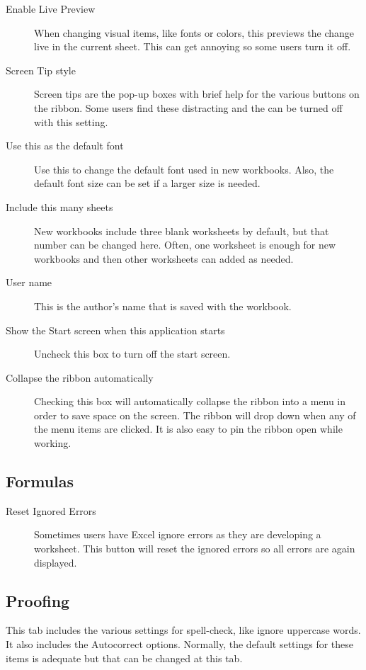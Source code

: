 \begin{description}
	\item[Enable Live Preview] When changing visual items, like fonts or colors, this previews the change live in the current sheet. This can get annoying so some users turn it off.
	\item[Screen Tip style] Screen tips are the pop-up boxes with brief help for the various buttons on the ribbon. Some users find these distracting and the can be turned off with this setting.
	\item[Use this as the default font] Use this to change the default font used in new workbooks. Also, the default font size can be set if a larger size is needed.
	\item[Include this many sheets] New workbooks include three blank worksheets by default, but that number can be changed here. Often, one worksheet is enough for new workbooks and then other worksheets can added as needed.
	\item[User name] This is the author's name that is saved with the workbook.
	\item[Show the Start screen when this application starts] Uncheck this box to turn off the start screen.
	\item[Collapse the ribbon automatically] Checking this box will automatically collapse the ribbon into a menu in order to save space on the screen. The ribbon will drop down when any of the menu items are clicked. It is also easy to pin the ribbon open while working.
\end{description}

\subsection{Formulas}

\begin{description}
	\item[Reset Ignored Errors] Sometimes users have Excel ignore errors as they are developing a worksheet. This button will reset the ignored errors so all errors are again displayed.
\end{description}

\subsection{Proofing}

This tab includes the various settings for spell-check, like ignore uppercase words. It also includes the Autocorrect options. Normally, the default settings for these items is adequate but that can be changed at this tab.

